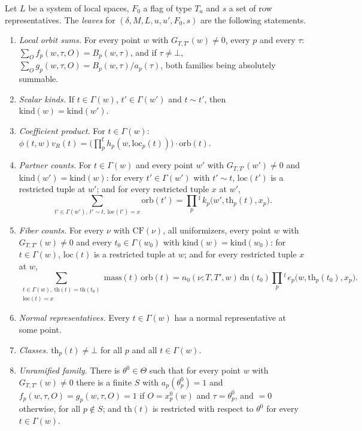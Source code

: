 \begin{definition}\label{pf:thmS-leaves:def:leaves}
Let $L$ be a system of local spaces, $F_0$ a flag of type $T_u$ and $s$ a set of row representatives. The \emph{leaves} for
$(\delta,M,L,u,u',F_0,s)$ are the following statements.
\begin{enumerate}[label=(L\arabic*)]
\item \emph{Local orbit sums.} For every point $w$ with $G_{T,T'}(w)\ne0$, every $p$ and every $\tau$:
$\sum_Of_p(w,\tau,O)=B_p(w,\tau)$, and if $\tau\ne\bot$, $\sum_Og_p(w,\tau,O)=B_p(w,\tau)/a_p(\tau)$, both families being
absolutely summable.
\item \emph{Scalar kinds.} If $t\in\Gamma(w)$, $t'\in\Gamma(w')$ and $t\sim t'$, then $\mathrm{kind}(w)=\mathrm{kind}(w')$.
\item \emph{Coefficient product.} For $t\in\Gamma(w)$: $\phi(t,w)v_R(t)=\bigl(\prod^{\mathrm f}_ph_p(w,\mathrm{loc}_p(t))\bigr)\cdot\mathrm{orb}(t)$.
\item \emph{Partner counts.} For $t\in\Gamma(w)$ and every point $w'$ with $G_{T,T'}(w')\ne0$ and $\mathrm{kind}(w')=\mathrm{kind}(w)$:
for every $t'\in\Gamma(w')$ with $t'\sim t$, $\mathrm{loc}(t')$ is a restricted tuple at $w'$; and for every restricted tuple $x$
at $w'$,
\[
\sum_{t'\in\Gamma(w'),\ t'\sim t,\ \mathrm{loc}(t')=x}\mathrm{orb}(t')=\prod_p{}^{\mathrm f}\,k_p\bigl(w',\mathrm{th}_p(t),x_p\bigr).
\]
\item \emph{Fiber counts.} For every $\nu$ with $\mathrm{CF}(\nu)$, all uniformizers, every point $w$ with $G_{T,T'}(w)\ne0$ and
every $t_0\in\Gamma(w_0)$ with $\mathrm{kind}(w)=\mathrm{kind}(w_0)$: for $t\in\Gamma(w)$, $\mathrm{loc}(t)$ is a restricted tuple at $w$;
and for every restricted tuple $x$ at $w$,
\[
\sum_{\substack{t\in\Gamma(w),\ \mathrm{th}(t)=\mathrm{th}(t_0)\\ \mathrm{loc}(t)=x}}\mathrm{mass}(t)\,\mathrm{orb}(t)
=n_0(\nu;T,T',w)\,\mathrm{dn}(t_0)\prod_p{}^{\mathrm f}\,e_p\bigl(w,\mathrm{th}_p(t_0),x_p\bigr).
\]
\item \emph{Normal representatives.} Every $t\in\Gamma(w)$ has a normal representative at some point.
\item \emph{Classes.} $\mathrm{th}_p(t)\ne\bot$ for all $p$ and all $t\in\Gamma(w)$.
\item \emph{Unramified family.} There is $\theta^0\in\Theta$ such that for every point $w$ with $G_{T,T'}(w)\ne0$ there is a
finite $S$ with $a_p(\theta^0_p)=1$ and $f_p(w,\tau,O)=g_p(w,\tau,O)=1$ if $O=x^0_p(w)$ and $\tau=\theta^0_p$, and $=0$ otherwise,
for all $p\notin S$; and $\mathrm{th}(t)$ is restricted with respect to $\theta^0$ for every $t\in\Gamma(w)$.
\end{enumerate}
\end{definition}

